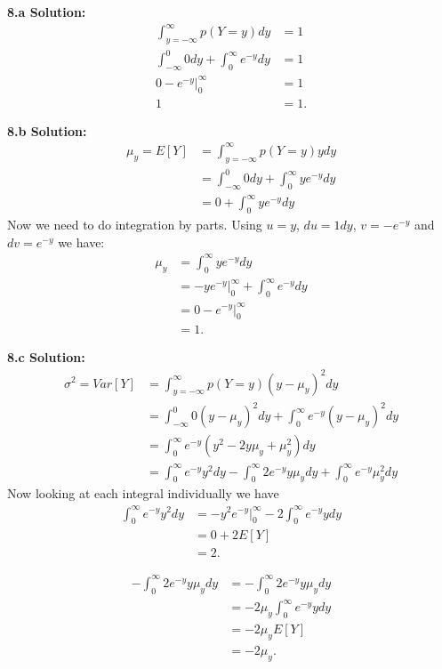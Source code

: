 \documentclass[a4paper]{article}
\begin{document}
\textbf{8.a Solution:}
\begin{align*}
\int_{y=-\infty}^{\infty} p(Y=y) dy &= 1 \\
\int_{-\infty}^{0} 0 dy + \int_{0}^{\infty} e^{-y} dy &= 1 \\
0 - e^{-y} |^{\infty}_0  &= 1 \\
1  &= 1.
\end{align*}

\textbf{8.b Solution:}
\begin{align*}
\mu_y = E[Y] &= \int_{y=-\infty}^{\infty} p(Y=y)y dy \\
&= \int_{-\infty}^{0} 0 dy + \int_{0}^{\infty} ye^{-y} dy \\
&= 0+\int_{0}^{\infty} ye^{-y} dy
\end{align*}
Now we need to do integration by parts. Using $u=y$,
$du=1dy$, $v=-e^{-y}$ and $dv=e^{-y}$ we have:
\begin{align*}
 \mu_y&= \int_{0}^{\infty} ye^{-y} dy \\
 &= -ye^{-y}|_{0}^{\infty} + \int_{0}^{\infty} e^{-y} dy \\
 &= 0 -e^{-y}|_{0}^{\infty} \\
 &= 1.
\end{align*}

\textbf{8.c Solution:}
\begin{align*}
\sigma^2=Var[Y]&=\int_{y=-\infty}^{\infty} p(Y=y)(y-\mu_y)^2dy \\
&=\int_{-\infty}^{0} 0(y-\mu_y)^2dy + \int_{0}^{\infty} e^{-y}(y-\mu_y)^2dy\\
&= \int_{0}^{\infty} e^{-y}(y^2-2y\mu_y+\mu_y^2)dy\\
&= \int_{0}^{\infty} e^{-y}y^2 dy -\int_{0}^{\infty}2e^{-y}y\mu_y dy+\int_{0}^{\infty}e^{-y}\mu_y^2dy
\end{align*}
Now looking at each integral individually we have
\begin{align*}
\int_{0}^{\infty} e^{-y}y^2 dy &= -y^2e^{-y}|_{0}^{\infty} - 2\int_{0}^{\infty} e^{-y}y dy\\
&= 0 +2E[Y] \\
&=  2.
\end{align*}

\begin{align*}
-\int_{0}^{\infty}2e^{-y}y\mu_y dy &= -\int_{0}^{\infty}2e^{-y}y\mu_y dy\\
&= -2\mu_y\int_{0}^{\infty}e^{-y}y dy\\
&= -2\mu_yE[Y]\\
&= -2\mu_y.
\end{align*}
\end{document}
